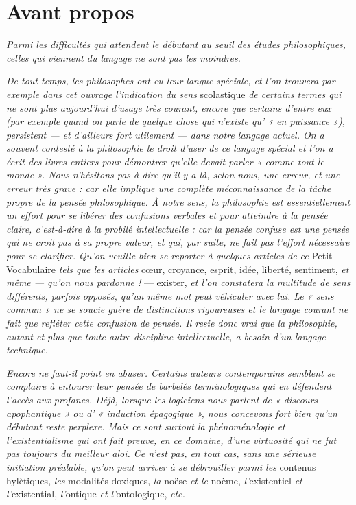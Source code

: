 
\section{Avant propos}

{\it Parmi les difficultés qui attendent le débutant au seuil des études philosophiques,
celles qui viennent du langage ne sont pas les moindres.}

{\it De tout temps, les philosophes ont eu leur langue spéciale, et l’on trouvera
par exemple dans cet ouvrage l'indication du sens} scolastique {\it de certains
termes qui ne sont plus aujourd’hui d'usage très courant, encore que certains
d'entre eux (par exemple quand on parle de quelque chose qui n'existe qu’ « en
puissance »), persistent — et d’ailleurs fort utilement — dans notre langage
actuel. On a souvent contesté à la philosophie le droit d’user de ce langage
spécial et l’on a écrit des livres entiers pour démontrer qu’elle devait parler
« comme tout le monde ». Nous n’hésitons pas à dire qu’il y a là, selon nous, une
erreur, et une erreur très grave : car elle implique une complète méconnaissance
de la tâche propre de la pensée philosophique. À notre sens, la philosophie
est essentiellement un effort pour se libérer des confusions verbales et pour
atteindre à la pensée claire, c’est-à-dire à la probilé intellectuelle : car la
pensée confuse est une pensée qui ne croit pas à sa propre valeur, et qui, par
suite, ne fait pas l'effort nécessaire pour se clarifier. Qu’on veuille bien se
reporter à quelques articles de ce} Petit Vocabulaire {\it tels que les articles} cœur,
croyance, esprit, idée, liberté, sentiment, {\it et même — qu’on nous pardonne !}
— exister, {\it et l’on constatera la multitude de sens différents, parfois opposés,
qu'un même mot peut véhiculer avec lui. Le « sens commun » ne se soucie
guère de distinctions rigoureuses et le langage courant ne fait que refléter
cette confusion de pensée. Il resie donc vrai que la philosophie, autant et plus
que toute autre discipline intellectuelle, a besoin d’un langage technique.}

{\it Encore ne faut-il point en abuser. Certains auteurs contemporains semblent
se complaire à entourer leur pensée de barbelés terminologiques qui en défendent
l’accès aux profanes. Déjà, lorsque les logiciens nous parlent de « discours
apophantique » ou d’ « induction épagogique », nous concevons fort bien
qu'un débutant reste perplexe. Mais ce sont surtout la phénoménologie et
l'existentialisme qui ont fait preuve, en ce domaine, d’une virtuosité qui ne
fut pas toujours du meilleur aloi. Ce n’est pas, en tout cas, sans une sérieuse
initiation préalable, qu'on peut arriver à se débrouiller parmi les} contenus
hylètiques, {\it les} modalités doxiques, {\it la} noëse {\it et le} noème, {\it l’}existentiel {\it et
l'}existential, {\it l'}ontique {\it et l'}ontologique, {\it etc.}

